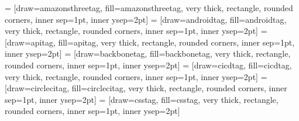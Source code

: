  = [draw=amazonsthreetag, fill=amazonsthreetag, very thick, rectangle, rounded corners, inner sep=1pt, inner ysep=2pt]
\newcommand{\amazonsthreetag}{\begin{tikzpicture}\node [amazonsthreetag] (box){{\scriptsize \color{white}{\textbf{\phantom{|}Amazon S3\phantom{|}}}}};\end{tikzpicture}}
 = [draw=androidtag, fill=androidtag, very thick, rectangle, rounded corners, inner sep=1pt, inner ysep=2pt]
\newcommand{\androidtag}{\begin{tikzpicture}\node [androidtag] (box){{\scriptsize \textbf{\phantom{|}Android\phantom{|}}}};\end{tikzpicture}}
 = [draw=apitag, fill=apitag, very thick, rectangle, rounded corners, inner sep=1pt, inner ysep=2pt]
\newcommand{\apitag}{\begin{tikzpicture}\node [apitag] (box){{\scriptsize \textbf{\phantom{|}API\phantom{|}}}};\end{tikzpicture}}
 = [draw=backbonetag, fill=backbonetag, very thick, rectangle, rounded corners, inner sep=1pt, inner ysep=2pt]
\newcommand{\backbonetag}{\begin{tikzpicture}\node [backbonetag] (box){{\scriptsize \color{white}{\textbf{\phantom{|}BackboneJS\phantom{|}}}}};\end{tikzpicture}}
 = [draw=cicdtag, fill=cicdtag, very thick, rectangle, rounded corners, inner sep=1pt, inner ysep=2pt]
\newcommand{\cicdtag}{\begin{tikzpicture}\node [cicdtag] (box){{\scriptsize \textbf{\phantom{|}CI/CD\phantom{|}}}};\end{tikzpicture}}
 = [draw=circlecitag, fill=circlecitag, very thick, rectangle, rounded corners, inner sep=1pt, inner ysep=2pt]
\newcommand{\circlecitag}{\begin{tikzpicture}\node [circlecitag] (box){{\scriptsize \textbf{\phantom{|}CircleCI\phantom{|}}}};\end{tikzpicture}}
 = [draw=csstag, fill=csstag, very thick, rectangle, rounded corners, inner sep=1pt, inner ysep=2pt]
\newcommand{\csstag}{\begin{tikzpicture}\node [csstag] (box){{\scriptsize \textbf{\phantom{|}CSS\phantom{|}}}};\end{tikzpicture}}
